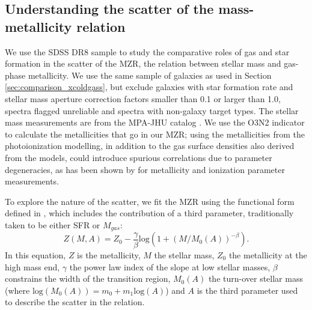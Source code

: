 \documentclass[fleqn,usenatbib]{mnras}
\begin{document}
\subsection{Understanding the scatter of the mass-metallicity relation}
\label{sec:MZR}
We use the SDSS DR8 sample to study the comparative roles of gas and star formation in the scatter of the MZR, the relation between stellar mass and gas-phase metallicity. We use the same sample of galaxies as used in Section \ref{sec:comparison_xcoldgass}, but exclude galaxies with star formation rate and stellar mass aperture correction factors smaller than 0.1 or larger than 1.0, spectra flagged unreliable and spectra with non-galaxy target types. The stellar mass measurements are from the MPA-JHU catalog \citep{kauffmann2003a}. We use the \cite{pettini2004} O3N2 indicator to calculate the metallicities that go in our MZR; using the metallicities from the photoionization modelling, in addition to the gas surface densities also derived from the models, could introduce spurious correlations due to parameter degeneracies, as has been shown by \cite{mingozzi2020} for metallicity and ionization parameter measurements.

To explore the nature of the scatter, we fit the MZR using the functional form defined in \cite{curti2020}, which includes the contribution of a third parameter, traditionally taken to be either SFR or $M_{gas}$:
\begin{equation}
\label{eq:mass_metallicity_scatter_function}
    Z(M, A) = Z_0 - \frac{\gamma}{\beta} \mathrm{log}(1 + (M/M_0(A))^{-\beta} ) .
\end{equation}
In this equation, $Z$ is the metallicity, $M$ the stellar mass, $Z_0$ the metallicity at the high mass end, $\gamma$ the power law index of the slope at low stellar masses, $\beta$ constrains the width of the transition region, $M_0(A)$ the turn-over stellar mass (where $\textrm{log}(M_0(A)) = m_0 + m_1\textrm{log}(A)$) and $A$ is the third parameter used to describe the scatter in the relation.
\end{document}
